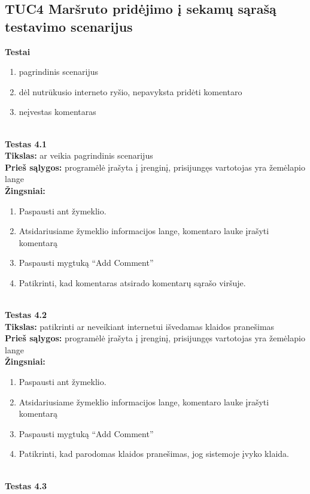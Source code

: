 \documentclass{VUMIFPSkursinis}
\begin{document}
	\subsection{TUC4 Maršruto pridėjimo į sekamų sąrašą testavimo scenarijus}
		\textbf{Testai}
		\begin{enumerate}[noitemsep,topsep=0pt]
			\item pagrindinis scenarijus
			\item dėl nutrūkusio interneto ryšio, nepavyksta pridėti komentaro
			\item neįvestas komentaras 
		\end{enumerate}
		\textbf{}\\
		\textbf{Testas 4.1}\\
		\textbf{Tikslas:} ar veikia pagrindinis scenarijus\\
		\textbf{Prieš sąlygos:} programėlė įrašyta į įrenginį, prisijungęs vartotojas yra žemėlapio lange\\
		\textbf{Žingsniai:}
		\begin{enumerate}[noitemsep,topsep=0pt]
			\item Paspausti ant žymeklio.
			\item Atsidariusiame žymeklio informacijos lange, komentaro lauke įrašyti komentarą
			\item Paspausti mygtuką “Add Comment”
			\item Patikrinti, kad komentaras atsirado komentarų sąrašo viršuje.
		\end{enumerate}
		\textbf{}\\
		\textbf{Testas 4.2}\\
		\textbf{Tikslas:} patikrinti ar neveikiant internetui išvedamas klaidos pranešimas\\
		\textbf{Prieš sąlygos:} programėlė įrašyta į įrenginį, prisijungęs vartotojas yra žemėlapio lange\\
		\textbf{Žingsniai:}
		\begin{enumerate}[noitemsep,topsep=0pt]
			\item Paspausti ant žymeklio.
			\item Atsidariusiame žymeklio informacijos lange, komentaro lauke įrašyti komentarą
			\item Paspausti mygtuką “Add Comment”
			\item Patikrinti, kad parodomas klaidos pranešimas, jog sistemoje įvyko klaida.
		\end{enumerate}
		\textbf{}\\
		\textbf{Testas 4.3}\\
\end{document}
